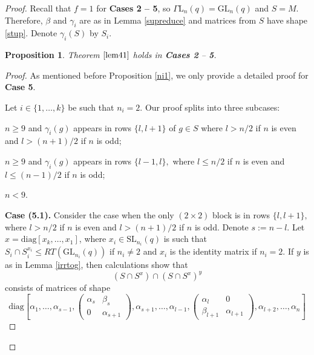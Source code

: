 \documentclass[a4paper,reqno,11pt]{amsart}
\newtheorem{Prop}[Th]{Proposition}
\theoremstyle{definition}
\theoremstyle{remark}
\numberwithin{equation}{section}
\newcommand{\diag}{\mathrm{diag}}
\newcommand{\GaL}{{\Gamma \mathrm{L}}}
\newcommand{\SL}{{\mathrm{SL}}}
\newcommand{\GL}{{\mathrm{GL}}}
\begin{document}
\begin{proof}
\bigskip

Recall that $f=1$ for {\bf Cases 2 -- 5}, so $\GaL_n(q)=\GL_n(q)$ and $S=M.$ Therefore, $\beta$ and $\gamma_i$ are as in Lemma \ref{supreduce} and matrices from $S$ have shape \eqref{stup}. Denote $\gamma_i(S)$ by $S_i$.






\begin{Prop}
\label{case5prop}
Theorem $\ref{lem41}$ holds in {\bf Cases 2} -- {\bf 5}.
\end{Prop}
\begin{proof}
As mentioned before Proposition \ref{ni1}, we only provide a detailed proof for {\bf Case 5}.

 Let $i \in \{1, \ldots, k\}$  be  such that $n_i=2$. Our proof  splits into three subcases:
\begin{description}[before={\renewcommand\makelabel[1]{\bfseries ##1}}]
\item[{\bf Case (5.1)}] $n\ge 9$ and $\gamma_i(g)$ appears in rows  $\{l,l+1\}$ of $g \in S$ where $l>n/2$ if $n$ is even and $l>(n+1)/2$ if $n$ is odd;
\item[{\bf Case (5.2)}] $n \ge 9$ and $\gamma_i(g)$ appears in rows $\{l-1,l\},$ where $l \le n/2$ if $n$ is even and $l \le (n-1)/2$ if $n$ is odd;
\item[{\bf Case (5.3)}] $n<9$.
\end{description} 

{\bf Case (5.1).} Consider the case when  the only $(2\times 2)$ block is in  rows $\{l,l+1\},$ where $l>n/2$ if $n$ is even and $l>(n+1)/2$ if $n$ is odd. Denote $s:=n-l$. Let $x= \diag[x_k, \ldots, x_1]$, where $x_i\in \SL_{n_i}(q)$ is such that $S_i \cap S_i^{x_i} \le RT(\GL_{n_i}(q))$ if $n_i \ne 2$ and $x_i$ is the identity matrix if $n_i=2.$ If $y$ is as in Lemma \ref{irrtog}, then  calculations show that  
$$(S \cap S^x) \cap (S \cap S^x)^y$$ consists of matrices of shape 
\begin{equation}\label{ugol} 
\diag[\alpha_1, \ldots, \alpha_{s-1}, \begin{pmatrix} \alpha_s & \beta_s \\ 0 & \alpha_{s+1} \end{pmatrix}, \alpha_{s+1}, \ldots, \alpha_{l-1},\begin{pmatrix} \alpha_l & 0 \\ \beta_{l+1} & \alpha_{l+1} \end{pmatrix}, \alpha_{l+2}, \ldots, \alpha_n ]
\end{equation}


\end{proof}
\end{proof}
\end{document}
